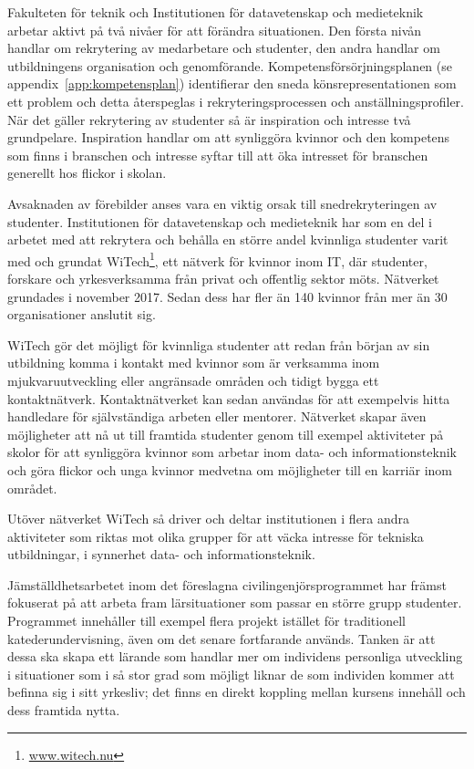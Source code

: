 Fakulteten för teknik och Institutionen för datavetenskap och medieteknik arbetar aktivt på två nivåer för att förändra situationen. Den första nivån handlar om rekrytering av medarbetare och studenter, den andra handlar om utbildningens organisation och genomförande. Kompetensförsörjningsplanen (se appendix~\ref{app:kompetensplan}) identifierar den sneda könsrepresentationen som ett problem och detta återspeglas i rekryteringsprocessen och anställningsprofiler. När det gäller rekrytering av studenter så är inspiration och intresse två grundpelare. Inspiration handlar om att synliggöra kvinnor och den kompetens som finns i branschen och intresse syftar till att öka intresset för branschen generellt hos flickor i skolan.

Avsaknaden av förebilder anses vara en viktig orsak till snedrekryteringen av studenter. Institutionen för datavetenskap och medieteknik har som en del i arbetet med att rekrytera och behålla en större andel kvinnliga studenter varit med och grundat WiTech\footnote{\url{www.witech.nu}}, ett nätverk för kvinnor inom IT, där studenter, forskare och yrkesverksamma från privat och offentlig sektor möts. Nätverket grundades i november 2017. Sedan dess har fler än 140 kvinnor från mer än 30 organisationer anslutit sig.

WiTech gör det möjligt för kvinnliga studenter att redan från början av sin utbildning komma i kontakt med kvinnor som är verksamma inom mjukvaruutveckling eller angränsade områden och tidigt bygga ett kontaktnätverk. Kontaktnätverket kan sedan användas för att exempelvis hitta handledare för självständiga arbeten eller mentorer. Nätverket skapar även möjligheter att nå ut till framtida studenter genom till exempel aktiviteter på skolor för att synliggöra kvinnor som arbetar inom data- och informationsteknik och göra flickor och unga kvinnor medvetna om möjligheter till en karriär inom området.

Utöver nätverket WiTech så driver och deltar institutionen i flera andra aktiviteter som riktas mot olika grupper för att väcka intresse för tekniska utbildningar, i synnerhet data- och informationsteknik.

Jämställdhetsarbetet inom det föreslagna civilingenjörsprogrammet har främst fokuserat på att arbeta fram lärsituationer som passar en större grupp studenter. Programmet innehåller till exempel flera projekt istället för traditionell katederundervisning, även om det senare fortfarande används. Tanken är att dessa ska skapa ett lärande som handlar mer om individens personliga utveckling i situationer som i så stor grad som möjligt liknar de som individen kommer att befinna sig i sitt yrkesliv; det finns en direkt koppling mellan kursens innehåll och dess framtida nytta.

